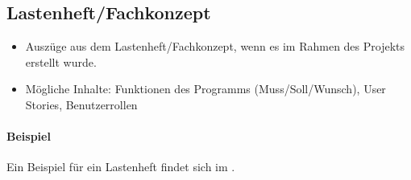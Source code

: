 \subsection{Lastenheft/Fachkonzept}
\label{sec:Lastenheft}
\begin{itemize}
	\item Auszüge aus dem Lastenheft/Fachkonzept, wenn es im Rahmen des Projekts erstellt wurde.
	\item Mögliche Inhalte: Funktionen des Programms (Muss/Soll/Wunsch), User Stories, Benutzerrollen
\end{itemize}

\paragraph{Beispiel}
Ein Beispiel für ein Lastenheft findet sich im . 

